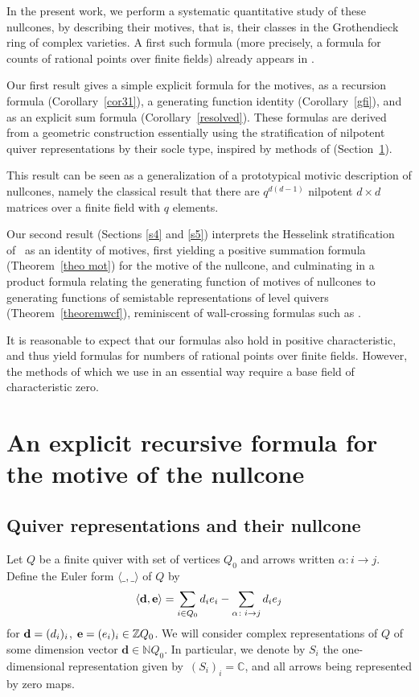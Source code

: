 \documentclass[pdftex]{sigma}
\numberwithin{equation}{section}
\theoremstyle{definition}
\begin{document}
In the present work, we perform a systematic quantitative study of these nullcones, by describing their motives, that is, their classes in the Grothendieck ring of complex varieties. A first such formula (more precisely, a formula for counts of rational points over finite fields) already appears in \cite[Lemma 2.6]{BSV}.

Our first result gives a simple explicit formula for the motives, as a recursion formula (Corollary~\ref{cor31}), a generating function identity (Corollary~\ref{gfi}), and as an explicit sum formula (Corollary~\ref{resolved}). These formulas are derived from a geometric construction essentially using the stratification of nilpotent quiver representations by their socle type, inspired by methods of \cite{RCounting} (Section~\ref{s2}).

This result can be seen as a generalization of a prototypical motivic description of nullcones, namely the classical result \cite{FH} that there are $q^{d(d-1)}$ nilpotent $d\times d$ matrices over a finite field with $q$ elements.

Our second result (Sections \ref{s4} and \ref{s5}) interprets the Hesselink stratification of~\cite{LB} as an identity of motives, first yielding a positive summation formula (Theorem~\ref{theo mot}) for the motive of the nullcone, and culminating in a product formula relating the generating function of motives of nullcones to generating functions of semistable representations of level quivers (Theorem~\ref{theoremwcf}), reminiscent of wall-crossing formulas such as \cite[Theorem~2.4]{MozIntro}.

It is reasonable to expect that our formulas also hold in positive characteristic, and thus yield formulas for numbers of rational points over finite fields. However, the methods of \cite{B,Hesse} which we use in an essential way require a base field of characteristic zero.

\section{An explicit recursive formula for the motive of the nullcone}\label{s2}

\subsection{Quiver representations and their nullcone}

Let $Q$ be a finite quiver with set of vertices $Q_0$ and arrows written $\alpha\colon i\rightarrow j$. Define the Euler form $\langle\_,\_\rangle$ of $Q$ by
\[\langle{\bf d},{\bf e}\rangle=\sum_{i\in Q_0}d_ie_i-\sum_{\alpha\colon i\rightarrow j}d_ie_j\]
for ${\bf d}=(d_i)_i$, ${\bf e}=(e_i)_i\in\mathbb{Z}Q_0$. We will consider complex representations of $Q$ of some dimension vector $\mathbf{d}\in\mathbb{N}Q_0$. In particular, we denote by $S_i$ the one-dimensional representation given by~$(S_i)_i=\mathbb{C}$, and all arrows being represented by zero maps.
\end{document}
